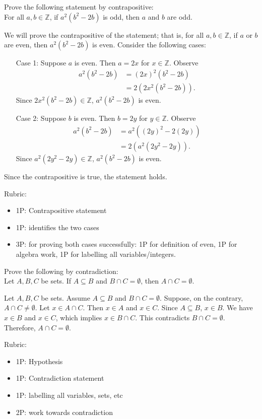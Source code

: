 \documentclass{article}
\newcommand{\Z}{\mathbb{Z}}
\theoremstyle{definition}
\begin{document}
\begin{question}{5}
    Prove the following statement by contrapositive: \\
    For all $a, b\in \mathbb{Z}$, if $a^2(b^2-2b)$ is odd, then $a$ and $b$ are odd.
\end{question}
\begin{solution}
We will prove the contrapositive of the statement; that is, for all $a, b\in \mathbb{Z}$, if $a$ or $b$ are even, then $a^2(b^2-2b)$ is even. Consider the following cases:
\begin{itemize}
\item[Case 1:] Suppose $a$ is even. Then $a=2x$ for $x\in\Z$. Observe
\begin{align*}
a^2(b^2-2b) & = (2x)^2 (b^2-2b)\\
& = 2(2x^2(b^2-2b)).
\end{align*}
Since $2x^2(b^2-2b)\in\Z$, $a^2(b^2-2b)$ is even.
\item[Case 2:] Suppose $b$ is even. Then $b=2y$ for $y\in\Z$. Observe
\begin{align*}
a^2(b^2-2b) & = a^2 ((2y)^2-2(2y))\\
& = 2(a^2(2y^2-2y)).
\end{align*}
Since $a^2(2y^2-2y)\in\Z$, $a^2(b^2-2b)$ is even.
\end{itemize}
Since the contrapositive is true, the statement holds.

{\color{red} Rubric:
\begin{itemize}
\item 1P: Contrapositive statement
\item 1P: identifies the two cases
\item 3P: for proving both cases successfully: 1P for definition of even, 1P for algebra work, 1P for labelling all variables/integers.
\end{itemize}}
\end{solution}


\begin{question}{5}
    Prove the following by contradiction:\\
    Let $A, B, C$ be sets. If $A\subseteq B$ and $B\cap C=\emptyset$, then $A\cap C=\emptyset$.
\end{question}
\begin{solution}
      Let $A, B, C$ be sets. Assume $A\subseteq B$ and $B\cap C=\emptyset$. Suppose, on the contrary, $A\cap C\neq\emptyset$. Let $x\in A\cap C$. Then $x\in A$ and $x\in C$. Since $A\subseteq B$, $x\in B$. We have $x\in B$ and $x\in C$, which implies $x \in B\cap C$. This contradicts $B\cap C=\emptyset$. Therefore, $A\cap C=\emptyset$.
	
{\color{red} Rubric:
\begin{itemize}
\item 1P: Hypothesis
\item 1P: Contradiction statement
\item 1P: labelling all variables, sets, etc
\item 2P: work towards contradiction
\end{itemize}}
\end{solution}
\end{document}
